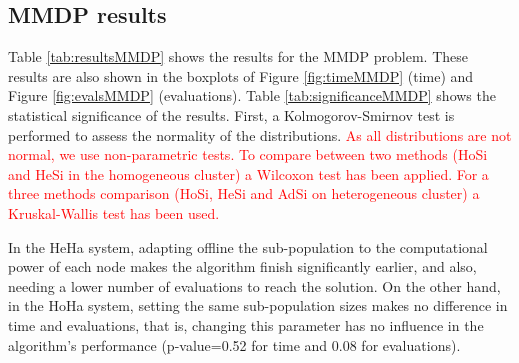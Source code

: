 \documentclass[final,1p,times]{elsarticle}
\begin{document}
\subsection{MMDP results}

Table \ref{tab:resultsMMDP} shows the results for the MMDP problem. These results are also shown in the boxplots of Figure \ref{fig:timeMMDP} (time) and Figure \ref{fig:evalsMMDP} (evaluations). Table \ref{tab:significanceMMDP} shows the statistical significance of the results. First, a Kolmogorov-Smirnov test is performed to assess the normality of the distributions. \textcolor{red}{As all distributions are not normal, we use non-parametric tests. To compare between two methods (HoSi and HeSi in the homogeneous cluster) a Wilcoxon test has been applied. For a three methods comparison (HoSi, HeSi and AdSi on heterogeneous cluster) a Kruskal-Wallis test has been used.} %

 In the HeHa system, adapting offline the sub-population to the computational
 power of each node makes the algorithm finish significantly earlier,
 and also, needing a lower number of evaluations to reach the solution. On the other hand, in the HoHa system,
 setting the same sub-population sizes makes no difference in time and
 evaluations, that is, changing this parameter has no influence in the
 algorithm's performance (p-value=0.52 for time and 0.08 for evaluations).


\begin{table}
\centering
\caption{Results for the MMDP problem.}
\label{tab:resultsMMDP}
\end{table}
\end{document}
